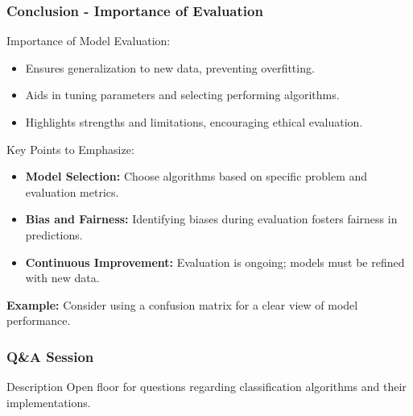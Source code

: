 \documentclass[aspectratio=169]{beamer}
\begin{document}
\begin{frame}[fragile]
    \frametitle{Conclusion - Importance of Evaluation}
    \begin{block}{Importance of Model Evaluation:}
        \begin{itemize}
            \item Ensures generalization to new data, preventing overfitting.
            \item Aids in tuning parameters and selecting performing algorithms.
            \item Highlights strengths and limitations, encouraging ethical evaluation.
        \end{itemize}
    \end{block}

    \begin{block}{Key Points to Emphasize:}
        \begin{itemize}
            \item \textbf{Model Selection:} Choose algorithms based on specific problem and evaluation metrics.
            \item \textbf{Bias and Fairness:} Identifying biases during evaluation fosters fairness in predictions.
            \item \textbf{Continuous Improvement:} Evaluation is ongoing; models must be refined with new data.
        \end{itemize}
    \end{block}
    
    \textbf{Example:} Consider using a confusion matrix for a clear view of model performance.
\end{frame}

\begin{frame}
    \frametitle{Q\&A Session}
    \begin{block}{Description}
        Open floor for questions regarding classification algorithms and their implementations.
    \end{block}
\end{frame}
\end{document}
